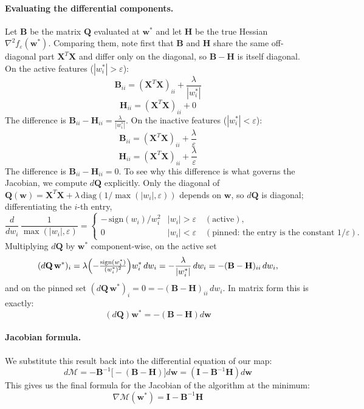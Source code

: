 \paragraph{Evaluating the differential components.}
Let $\mathbf{B}$ be the matrix $\mathbf{Q}$ evaluated at $\mathbf{w}^*$ and let $\mathbf{H}$ be the true Hessian $\nabla^2 f_\varepsilon(\mathbf{w}^*)$.
Comparing them, note first that $\mathbf{B}$ and $\mathbf{H}$ share the same off-diagonal part $\mathbf{X}^T\mathbf{X}$ and differ only on the diagonal, so $\mathbf{B}-\mathbf{H}$ is itself diagonal.
On the active features ($|w^*_i|>\varepsilon$):
\[
    \mathbf{B}_{ii} = (\mathbf{X}^T\mathbf{X})_{ii} + \frac{\lambda}{|w^*_i|}
\]
\[
    \mathbf{H}_{ii} = (\mathbf{X}^T\mathbf{X})_{ii} + 0
\]
The difference is $\mathbf{B}_{ii} - \mathbf{H}_{ii} = \frac{\lambda}{|w^*_i|}$.
On the inactive features ($|w^*_i|<\varepsilon$):
\[
    \mathbf{B}_{ii} = (\mathbf{X}^T\mathbf{X})_{ii} + \frac{\lambda}{\varepsilon}
\]
\[
    \mathbf{H}_{ii} = (\mathbf{X}^T\mathbf{X})_{ii} + \frac{\lambda}{\varepsilon}
\]
The difference is $\mathbf{B}_{ii} - \mathbf{H}_{ii} = 0$.
To see why this difference is what governs the Jacobian, we compute $d\mathbf{Q}$ explicitly. Only the diagonal of $\mathbf{Q}(\mathbf{w})=\mathbf{X}^T\mathbf{X}+\lambda\,\mathrm{diag}(1/\max(|w_i|,\varepsilon))$ depends on $\mathbf{w}$, so $d\mathbf{Q}$ is diagonal; differentiating the $i$-th entry,
\[
    \frac{d}{dw_i}\,\frac{1}{\max(|w_i|,\varepsilon)}
    =\begin{cases}
        -\,\mathrm{sign}(w_i)/w_i^2 & |w_i|>\varepsilon \quad(\text{active}),\\[2pt]
        0 & |w_i|<\varepsilon \quad(\text{pinned: the entry is the constant }1/\varepsilon).
    \end{cases}
\]
Multiplying $d\mathbf{Q}$ by $\mathbf{w}^*$ component-wise, on the active set
\[
    (d\mathbf{Q}\,\mathbf{w}^*)_i
    = \lambda\Bigl(-\tfrac{\mathrm{sign}(w^*_i)}{(w^*_i)^2}\Bigr)w^*_i\,dw_i
    = -\frac{\lambda}{|w^*_i|}\,dw_i
    = -(\mathbf{B}-\mathbf{H})_{ii}\,dw_i,
\]
and on the pinned set $(d\mathbf{Q}\,\mathbf{w}^*)_i = 0 = -(\mathbf{B}-\mathbf{H})_{ii}\,dw_i$. In matrix form this is exactly:
\begin{equation}
    (d\mathbf{Q})\mathbf{w}^* = -(\mathbf{B}-\mathbf{H})d\mathbf{w}
    \label{app:eq:dQ_clean}
\end{equation}

\paragraph{Jacobian formula.}
We substitute this result back into the differential equation of our map:
\[
    d\mathcal{M}
    = -\mathbf{B}^{-1}\bigl[-(\mathbf{B}-\mathbf{H})\bigr]d\mathbf{w}
    = (\mathbf{I}-\mathbf{B}^{-1}\mathbf{H})d\mathbf{w}
\]
This gives us the final formula for the Jacobian of the algorithm at the minimum:
\begin{equation}
    \nabla\mathcal{M}(\mathbf{w}^*) = \mathbf{I} - \mathbf{B}^{-1}\mathbf{H}
    \label{app:eq:jacobian}
\end{equation}

